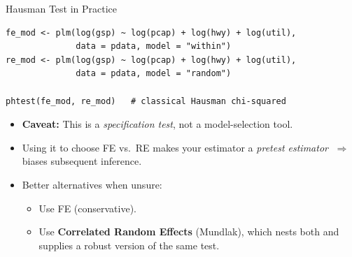 \documentclass[aspectratio=169, handout, t]{beamer}
\numberwithin{equation}{section}
\begin{document}
\begin{frame}[fragile]{Hausman Test in Practice}
\begin{lstlisting}
fe_mod <- plm(log(gsp) ~ log(pcap) + log(hwy) + log(util),
              data = pdata, model = "within")
re_mod <- plm(log(gsp) ~ log(pcap) + log(hwy) + log(util),
              data = pdata, model = "random")

phtest(fe_mod, re_mod)   # classical Hausman chi-squared
\end{lstlisting}
\begin{itemize}
  \item \textbf{Caveat:} This is a \emph{specification test}, not a model-selection tool.
  \item Using it to choose FE vs.\ RE makes your estimator a
        \emph{pretest estimator} $\;\Rightarrow\;$ biases subsequent inference.\pause
  \item Better alternatives when unsure:
    \begin{itemize}
      \item Use FE (conservative).
      \item Use \textbf{Correlated Random Effects} (Mundlak), which nests both
            and supplies a robust version of the same test.
    \end{itemize}
\end{itemize}
\end{frame}
\end{document}
